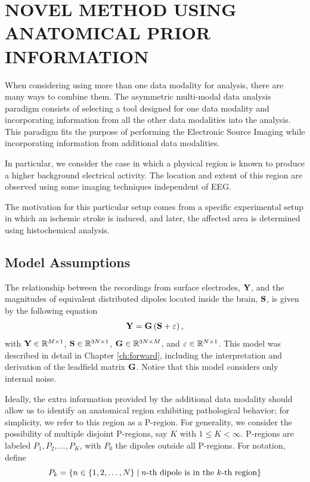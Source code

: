 \chapter{NOVEL METHOD USING ANATOMICAL PRIOR INFORMATION}
\label{ch:new_model}
%


When considering using more than one data modality for analysis, there are many ways to combine them. 
%
The asymmetric multi-modal data analysis paradigm consists of selecting a tool designed for one data modality and incorporating information from all the other data modalities into the analysis.
%
This paradigm fits the purpose of performing the Electronic Source Imaging while incorporating information from additional data modalities.


In particular, we consider the case in which a physical region is known to produce a higher background electrical activity.
%
The location and extent of this region are observed using some imaging techniques independent of EEG.

The motivation for this particular setup comes from a specific experimental setup in which an ischemic stroke is induced, and later, the affected area is determined using histochemical analysis.

\section{Model Assumptions}

The relationship between the recordings from surface electrodes, $\mathbf{Y}$, and the magnitudes of equivalent distributed dipoles located inside the brain, $\mathbf{S}$, is given by the following equation
\begin{equation}
\mathbf{Y} = \mathbf{G} \left( \mathbf{S} + \varepsilon \right),
\label{eq:3.1}
\end{equation}
with $\mathbf{Y} \in \mathbb{R}^{M \times 1}$, $\mathbf{S} \in \mathbb{R}^{3N \times 1}$, $\mathbf{G} \in \mathbb{R}^{3N\times M}$, and $\varepsilon\in \mathbb{R}^{N\times 1}$.
%
This model was described in detail in Chapter \ref{ch:forward}, including the interpretation and derivation of the leadfield matrix $\mathbf{G}$.
%
Notice that this model considers only internal noise.

Ideally, the extra information provided by the additional data modality should allow us to identify an anatomical region exhibiting pathological behavior; for simplicity, we refer to this region as a P-region. 
%
For generality, we consider the possibility of multiple disjoint P-regions, say $K$ with $1\leq K < \infty$.
%
P-regions are labeled $P_1, P_2, \dots, P_K$, with $P_0$ the dipoles outside all P-regions.
%
For notation, define 
\begin{equation}
    P_k = \left\{  n\in \left\{ 1, 2, \dots, N \right\} \;\middle|\; n\text{-th dipole is in the } k\text{-th region}  \right\}
\end{equation}

